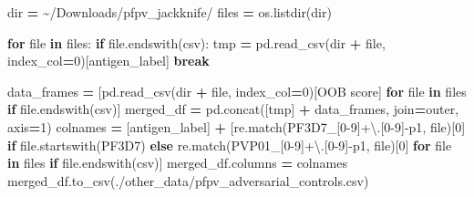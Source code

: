 \documentclass[
  11pt,
  oneside]{book}
\newenvironment{Shaded}{\begin{snugshade}}{\end{snugshade}}
\newcommand{\BuiltInTok}[1]{#1}
\newcommand{\ControlFlowTok}[1]{\textcolor[rgb]{0.13,0.29,0.53}{\textbf{#1}}}
\newcommand{\DecValTok}[1]{\textcolor[rgb]{0.00,0.00,0.81}{#1}}
\newcommand{\KeywordTok}[1]{\textcolor[rgb]{0.13,0.29,0.53}{\textbf{#1}}}
\newcommand{\NormalTok}[1]{#1}
\newcommand{\OperatorTok}[1]{\textcolor[rgb]{0.81,0.36,0.00}{\textbf{#1}}}
\newcommand{\StringTok}[1]{\textcolor[rgb]{0.31,0.60,0.02}{#1}}
\begin{document}
\begin{Shaded}
\begin{Highlighting}[]
\BuiltInTok{dir} \OperatorTok{=} \StringTok{\textquotesingle{}\textasciitilde{}/Downloads/pfpv\_jackknife/\textquotesingle{}}
\NormalTok{files }\OperatorTok{=}\NormalTok{ os.listdir(}\BuiltInTok{dir}\NormalTok{)}

\ControlFlowTok{for} \BuiltInTok{file} \KeywordTok{in}\NormalTok{ files:}
    \ControlFlowTok{if} \BuiltInTok{file}\NormalTok{.endswith(}\StringTok{\textquotesingle{}csv\textquotesingle{}}\NormalTok{):}
\NormalTok{        tmp }\OperatorTok{=}\NormalTok{ pd.read\_csv(}\BuiltInTok{dir} \OperatorTok{+} \BuiltInTok{file}\NormalTok{, index\_col}\OperatorTok{=}\DecValTok{0}\NormalTok{)[}\StringTok{\textquotesingle{}antigen\_label\textquotesingle{}}\NormalTok{]}
        \ControlFlowTok{break}

\NormalTok{data\_frames }\OperatorTok{=}\NormalTok{ [pd.read\_csv(}\BuiltInTok{dir} \OperatorTok{+} \BuiltInTok{file}\NormalTok{, index\_col}\OperatorTok{=}\DecValTok{0}\NormalTok{)[}\StringTok{\textquotesingle{}OOB score\textquotesingle{}}\NormalTok{] }\ControlFlowTok{for} \BuiltInTok{file} \KeywordTok{in}\NormalTok{ files }\ControlFlowTok{if} \BuiltInTok{file}\NormalTok{.endswith(}\StringTok{\textquotesingle{}csv\textquotesingle{}}\NormalTok{)]}
\NormalTok{merged\_df }\OperatorTok{=}\NormalTok{ pd.concat([tmp] }\OperatorTok{+}\NormalTok{ data\_frames, join}\OperatorTok{=}\StringTok{\textquotesingle{}outer\textquotesingle{}}\NormalTok{, axis}\OperatorTok{=}\DecValTok{1}\NormalTok{)}
\NormalTok{colnames }\OperatorTok{=}\NormalTok{ [}\StringTok{\textquotesingle{}antigen\_label\textquotesingle{}}\NormalTok{] }\OperatorTok{+}\NormalTok{ [re.match(}\StringTok{\textquotesingle{}PF3D7\_[0{-}9]+\textbackslash{}.[0{-}9]{-}p1\textquotesingle{}}\NormalTok{, }\BuiltInTok{file}\NormalTok{)[}\DecValTok{0}\NormalTok{] }\ControlFlowTok{if} \BuiltInTok{file}\NormalTok{.startswith(}\StringTok{\textquotesingle{}PF3D7\textquotesingle{}}\NormalTok{) }\ControlFlowTok{else}\NormalTok{ re.match(}\StringTok{\textquotesingle{}PVP01\_[0{-}9]+\textbackslash{}.[0{-}9]{-}p1\textquotesingle{}}\NormalTok{, }\BuiltInTok{file}\NormalTok{)[}\DecValTok{0}\NormalTok{] }\ControlFlowTok{for} \BuiltInTok{file} \KeywordTok{in}\NormalTok{ files }\ControlFlowTok{if} \BuiltInTok{file}\NormalTok{.endswith(}\StringTok{\textquotesingle{}csv\textquotesingle{}}\NormalTok{)]}
\NormalTok{merged\_df.columns }\OperatorTok{=}\NormalTok{ colnames}
\NormalTok{merged\_df.to\_csv(}\StringTok{\textquotesingle{}./other\_data/pfpv\_adversarial\_controls.csv\textquotesingle{}}\NormalTok{)}
\end{Highlighting}
\end{Shaded}
\end{document}
